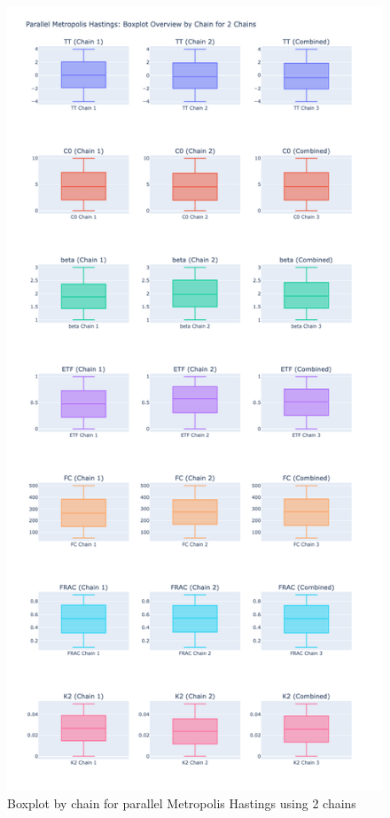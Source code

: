 \begin{figure}[H]
    \centering
    \includegraphics[width=1\textwidth]{figures/parallel_mh/boxplot_2.png}
    \captionsetup{width=.8\textwidth}
    \caption{Boxplot by chain for parallel Metropolis Hastings using 2 chains}
    \label{fig:enter-label}
\end{figure}